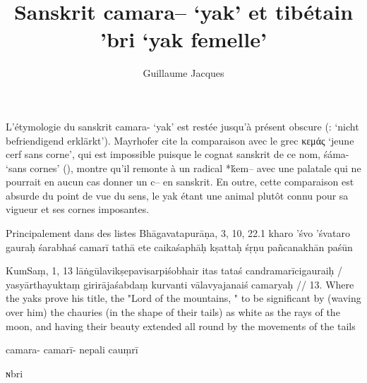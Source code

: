 \documentclass[oldfontcommands,oneside,a4paper,11pt]{article}
\newcommand{\ipa}[1]{{\phon #1}} %
\newcommand{\grec}[1]{{\mleccha #1}}
\begin{document}
 
\title{Sanskrit \ipa{camara--} `yak' et tibétain \ipa{'bri} `yak femelle'}
\author{Guillaume Jacques}
\maketitle
L'étymologie du sanskrit \ipa{camara-} `yak' est restée jusqu'à présent obscure (\citealt[I, 375]{mayrhofer56kurz}: `nicht befriendigend erklärkt'). Mayrhofer cite la comparaison avec le grec \grec{κεμάς} `jeune cerf sans corne', qui est impossible puisque le cognat sanskrit de ce nom, \ipa{śáma-} `sans cornes' (\citealt[II, 289]{mayrhofer56kurz}), montre qu'il remonte à un radical *\ipa{ḱem--} avec une palatale qui ne pourrait en aucun cas donner un \ipa{c--} en sanskrit. En outre, cette comparaison est absurde du point de vue du sens, le yak étant une animal plutôt connu pour sa vigueur et ses cornes imposantes.

Principalement dans des listes
Bhāgavatapurāṇa, 3, 10, 22.1
kharo 'śvo 'śvataro gauraḥ śarabhaś camarī tathā 
ete caikaśaphāḥ kṣattaḥ śṛṇu pañcanakhān paśūn


KumSaṃ, 1, 13
lāṅgūlavikṣepavisarpiśobhair itas tataś candramarīcigauraiḥ /
yasyārthayuktaṃ girirājaśabdaṃ kurvanti vālavyajanaiś camaryaḥ // 
13. Where the yaks prove his title, the "Lord of the 
mountains, " to be significant by (waving over him) the 
chauries (in the shape of their tails) as white as the rays of 
the moon, and having their beauty extended all round by 
the movements of the tails


\ipa{camara-}  \ipa{camarī-}
  nepali \ipa{cauṃrī}
  
  \ipa{ɴbri}
  
  \citet{jacques14snom}
  


\end{document}
